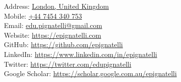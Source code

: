 Address: \href{https://goo.gl/maps/x1G2mCkBJvDdVE1t9}{London, United Kingdom} \\
Mobile: \href{tel:07454340753}{+44 7454 340 753} \\
Email:  \href{mailto:edu.pignatelli@gmail.com}{edu.pignatelli@gmail.com} \\
Website: \href{https://epignatelli.com}{https://epignatelli.com} \\
GitHub: \href{https://github.com/epignatelli}{https://github.com/epignatelli} \\
LinkedIn: \href{https://www.linkedin.com/in/epignatelli}{https://www.linkedin.com/in/epignatelli} \\
Twitter: \href{https://twitter.com/edupignatelli}{https://twitter.com/edupignatelli} \\
Google Scholar: \href{https://scholar.google.com.au/citations?user=d-TVZ1YAAAAJ\&hl=en}{https://scholar.google.com.au/epignatelli}
\vspace{1em}
